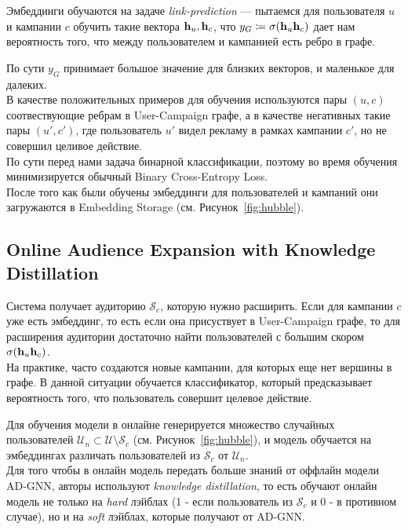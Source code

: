Эмбеддинги обучаются на задаче \textit{link-prediction} --- пытаемся для пользователя $u$ и кампании $c$ обучить такие вектора ${\bf h}_u, {\bf h}_c$, что $y_{G} \coloneqq \sigma({\bf h}_u {\bf h}_c)$ дает нам вероятность того, что между пользователем и кампанией есть ребро в графе. 

По сути $y_{G}$ принимает большое значение для близких векторов, и маленькое для далеких. \\

В качестве положительных примеров для обучения используются пары $(u, c)$ соотвествующие ребрам в User-Campaign графе, а в качестве негативных такие пары $(u', c')$, где пользователь $u'$ видел рекламу в рамках кампании $c'$, но не совершил целивое действие. \\

По сути перед нами задача бинарной классификации, поэтому во время обучения минимизируется обычный Binary Cross-Entropy Loss. \\

После того как были обучены эмбеддинги для пользователей и кампаний они загружаются в Embedding Storage (см. Рисунок~\ref{fig:hubble}).

\subsection*{Online Audience Expansion with Knowledge Distillation}

Система получает аудиторию $\mathcal{S}_c$, которую нужно расширить. Если для кампании $c$ уже есть эмбеддинг, то есть если она присуствует в User-Campaign графе, то для расширения аудитории достаточно найти пользователей с большим скором $\sigma({\bf h}_u {\bf h}_c)$. \\

На практике, часто создаются новые кампании, для которых еще нет вершины в графе. В данной ситуации обучается классификатор, который предсказывает вероятность того, что пользователь совершит целевое действие.

Для обучения модели в онлайне генерируется множество случайных пользователей $\mathcal{U}_n \subset \mathcal{U} \setminus \mathcal{S}_c$ (см. Рисунок~\ref{fig:hubble}), и модель обучается на эмбеддингах различать пользователей из $\mathcal{S}_c$ от $\mathcal{U}_n$. \\

Для того чтобы в онлайн модель передать больше знаний от оффлайн модели AD-GNN, авторы используют \textit{knowledge distillation}, то есть обучают онлайн модель не только на \textit{hard} лэйблах (1 - если пользователь из $\mathcal{S}_c$ и 0 - в противном случае), но и на \textit{soft} лэйблах, которые получают от AD-GNN.

